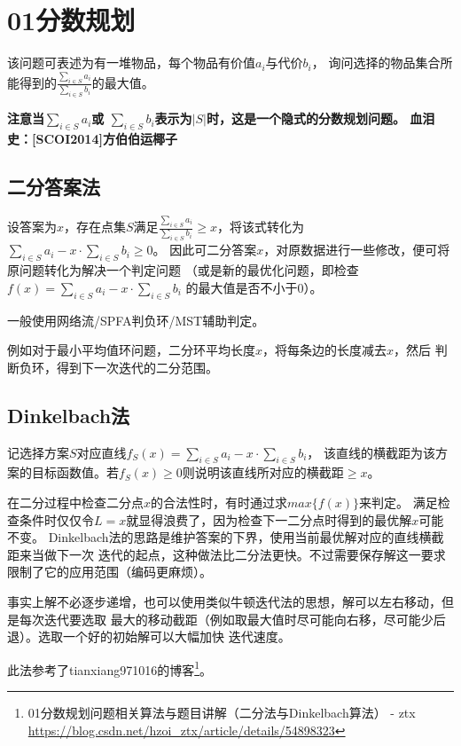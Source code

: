 \section{01分数规划}
该问题可表述为有一堆物品，每个物品有价值$a_i$与代价$b_i$，
询问选择的物品集合所能得到的$\frac{\displaystyle \sum_{i\in S}{a_i}}
	{\displaystyle \sum_{i\in S}{b_i}}$的最大值。

{\bfseries 注意当$\displaystyle \sum_{i\in S}{a_i}$或
$\displaystyle \sum_{i\in S}{b_i}$表示为$|S|$时，这是一个隐式的分数规划问题。
血泪史：[SCOI2014]方伯伯运椰子}

\subsection{二分答案法}

设答案为$x$，存在点集$S$满足$\frac{\displaystyle \sum_{i\in S}{a_i}}
	{\displaystyle \sum_{i\in S}{b_i}}\geq x$，将该式转化为
$\displaystyle \sum_{i\in S}{a_i}-x\cdot \sum_{i\in S}{b_i}\geq 0$。
因此可二分答案$x$，对原数据进行一些修改，便可将原问题转化为解决一个判定问题
（或是新的最优化问题，即检查
$\displaystyle f(x)=\sum_{i\in S}{a_i}-x\cdot \sum_{i\in S}{b_i}$
的最大值是否不小于0）。

一般使用网络流/SPFA判负环/MST辅助判定。

例如对于最小平均值环问题，二分环平均长度$x$，将每条边的长度减去$x$，然后
判断负环，得到下一次迭代的二分范围。

\subsection{Dinkelbach法}
记选择方案$S$对应直线$f_S(x)=\sum_{i\in S}{a_i}-x\cdot \sum_{i\in S}{b_i}$，
该直线的横截距为该方案的目标函数值。若$f_S(x)\geq 0$则说明该直线所对应的横截距$\geq x$。

在二分过程中检查二分点$x$的合法性时，有时通过求$max\{f(x)\}$来判定。
满足检查条件时仅仅令$L=x$就显得浪费了，因为检查下一二分点时得到的最优解$x$可能不变。
Dinkelbach法的思路是维护答案的下界，使用当前最优解对应的直线横截距来当做下一次
迭代的起点，这种做法比二分法更快。不过需要保存解这一要求限制了它的应用范围（编码更麻烦）。

事实上解不必逐步递增，也可以使用类似牛顿迭代法的思想，解可以左右移动，但是每次迭代要选取
最大的移动截距（例如取最大值时尽可能向右移，尽可能少后退）。选取一个好的初始解可以大幅加快
迭代速度。

此法参考了tianxiang971016的博客\footnote{
	01分数规划问题相关算法与题目讲解（二分法与Dinkelbach算法） - ztx
	\url{https://blog.csdn.net/hzoi\_ztx/article/details/54898323}
}。

